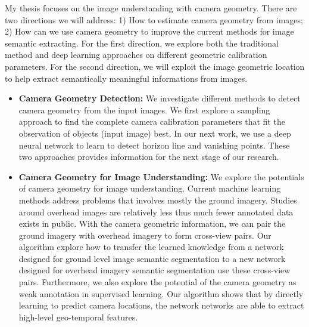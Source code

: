 My thesis focuses on the image understanding with camera geometry.
There are two directions we will address: 1) How to estimate camera
geometry from images; 2) How can we use camera geometry to improve the
current methods for image semantic extracting. For the first direction,
we explore both the traditional method and deep learning approaches on
different geometric calibration parameters. For the second direction,
we will exploit the image geometric location to help extract
semantically meaningful informations from images.

\begin{itemize}[noitemsep]

  \item \textbf{Camera Geometry Detection:} 
  We investigate different methods to detect camera geometry from the
  input images. We first explore a sampling approach to find the
  complete camera calibration parameters that fit the observation of
  objects (input image) best. In our next work, we use a deep neural
  network to learn to detect horizon line and vanishing points. These
  two approaches provides information for the next stage of our
  research.

  \item \textbf{Camera Geometry for Image Understanding:}
  We explore the potentials of camera geometry for image understanding.
  Current machine learning methods address problems that involves mostly
  the ground imagery. 
  Studies around overhead images are relatively less thus much fewer
  annotated data exists in public. With the camera geometric
  information, we can pair the ground imagery with overhead imagery to
  form cross-view pairs. Our algorithm explore how to transfer the
  learned knowledge from a network designed for ground level image
  semantic segmentation to a new network designed for overhead imagery
  semantic segmentation use these cross-view pairs.
  Furthermore, we also explore the potential of the camera geometry as
  weak annotation in supervised learning. Our algorithm shows that by
  directly learning to predict camera locations, the network networks
  are able to extract high-level geo-temporal features.
\end{itemize}

